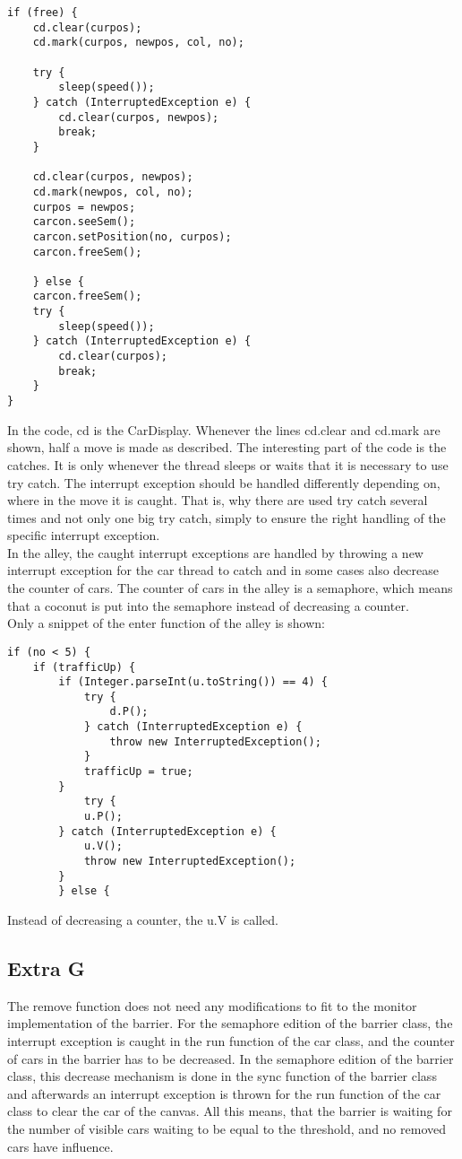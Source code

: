 \begin{lstlisting}
if (free) {
	cd.clear(curpos);
	cd.mark(curpos, newpos, col, no);

	try {
		sleep(speed());
	} catch (InterruptedException e) {
		cd.clear(curpos, newpos);
		break;
	}

	cd.clear(curpos, newpos);
	cd.mark(newpos, col, no);
	curpos = newpos;
	carcon.seeSem();
	carcon.setPosition(no, curpos);
	carcon.freeSem();

	} else {
	carcon.freeSem();
	try {
		sleep(speed());
	} catch (InterruptedException e) {
		cd.clear(curpos);
		break;
	}
}
\end{lstlisting}
\vspace{.8cm}

In the code, cd is the CarDisplay. Whenever the lines cd.clear and cd.mark are shown, half a move is made as described. The interesting part of the code is the catches. It is only whenever the thread sleeps or waits that it is necessary to use try catch. The interrupt exception should be handled differently depending on, where in the move it is caught. That is, why there are used try catch several times and not only one big try catch, simply to ensure the right handling of the specific interrupt exception. \\

In the alley, the caught interrupt exceptions are handled by throwing a new interrupt exception for the car thread to catch and in some cases also decrease the counter of cars. The counter of cars in the alley is a semaphore, which means that a coconut is put into the semaphore instead of decreasing a counter. \\
Only a snippet of the enter function of the alley is shown:

\begin{lstlisting}
if (no < 5) {
	if (trafficUp) {
		if (Integer.parseInt(u.toString()) == 4) {
			try {
				d.P();
			} catch (InterruptedException e) {
				throw new InterruptedException();
			}
			trafficUp = true;
		}
			try {
			u.P();
		} catch (InterruptedException e) {
			u.V();
			throw new InterruptedException();
		}
		} else {
\end{lstlisting}
\vspace{.8cm}

Instead of decreasing a counter, the u.V is called.

\subsection{Extra G}
The remove function does not need any modifications to fit to the monitor implementation of the barrier. For the semaphore edition of the barrier class, the interrupt exception is caught in the run function of the car class, and the counter of cars in the barrier has to be decreased. In the semaphore edition of the barrier class, this decrease mechanism is done in the sync function of the barrier class and afterwards an interrupt exception is thrown for the run function of the car class to clear the car of the canvas. All this means, that the barrier is waiting for the number of visible cars waiting to be equal to the threshold, and no removed cars have influence.